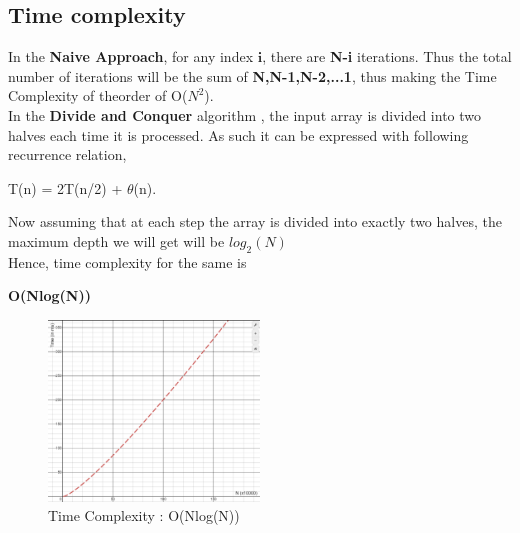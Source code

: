 \documentclass[conference]{IEEEtran}
\begin{document}
\subsection{Time complexity}
\noindent In the \textbf{Naive Approach}, for any index $\bm{i}$, there are \textbf{N-i} iterations. Thus the total number of iterations will be the sum of \textbf{N,N-1,N-2,...1}, thus making the Time Complexity of theorder of O($N^2$).\\
In the \textbf{Divide and Conquer} algorithm , the input array is divided into two halves each time it is processed.
As such it can be expressed with following recurrence relation,
\begin{center} T(n) = 2T(n/2) + $\theta$(n).\end{center}
Now assuming that at each step the array is divided into exactly two halves, the maximum depth we will get will be $log_2(N)$\\
Hence, time complexity for the same is \begin{center} \textbf{O(Nlog(N))} \end{center}
\begin{figure}[htbp!]
\includegraphics[width=0.5\textwidth]{timeComplexity.png}
\caption{Time Complexity : O(Nlog(N))}
\label{Time Complexity}
\end{figure}
\end{document}
